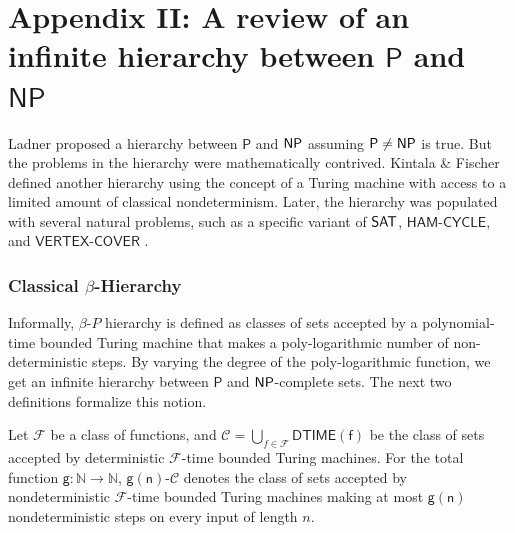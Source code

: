 \documentclass[11pt]{article}
\newcommand{\ms}[1]{\mathsf{#1}}
\begin{document}




\section{Appendix II: A review of an infinite hierarchy between $\ms{P}$ and $\ms{NP}$}
Ladner proposed a hierarchy between $\mathsf{P}$ and $\mathsf{NP}$ assuming $\mathsf{P} \neq \mathsf{NP}$ \cite{ladner1975structure} is true. But the problems in the hierarchy were mathematically contrived. Kintala \& Fischer \cite{Kintala1980-yv} defined another hierarchy using the concept of a Turing machine with access to a limited amount of classical nondeterminism. Later, the hierarchy was populated with several natural problems, such as a specific variant of $\mathsf{SAT}$, $\mathsf{HAM}$-$\mathsf{CYCLE}$, and $\mathsf{VERTEX}$-$\mathsf{COVER}$ \cite{farr1994problems}.\par
\subsubsection{Classical $\beta$-Hierarchy}\label{sec:classsical-hierarchy}
Informally, $\beta$-$P$ hierarchy is defined as classes of sets accepted by a polynomial-time bounded Turing machine that makes a poly-logarithmic number of non-deterministic steps. By varying the degree of the poly-logarithmic function, we get an infinite hierarchy between $\mathsf{P}$ and $\mathsf{NP}$-complete sets. The next two definitions formalize this notion.
\begin{definition}
     Let $\mathcal{F}$ be a class of functions, and $\mathcal{C}=\bigcup_{f\in \mathcal{F}} \mathsf{DTIME(f)}$ be the class of sets accepted by deterministic $\mathcal{F}$-time bounded Turing machines. For the total function $\mathsf{g}:\mathbb{N}\rightarrow \mathbb{N}$, $\mathsf{g(n)}$-$\mathcal{C}$ denotes the class of sets accepted by nondeterministic $\mathcal{F}$-time bounded Turing machines making at most $\mathsf{g(n)}$ nondeterministic steps on every input of length $n$.
\end{definition}
\end{document}
